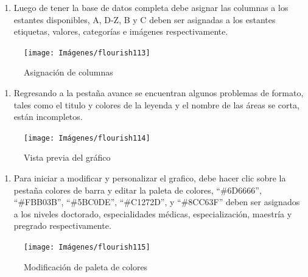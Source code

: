 \documentclass[
]{book}
\providecommand{\tightlist}{%
  \setlength{\itemsep}{0pt}\setlength{\parskip}{0pt}}
\begin{document}
\begin{enumerate}
\def\labelenumi{\arabic{enumi}.}
\setcounter{enumi}{3}
\tightlist
\item
  Luego de tener la base de datos completa debe asignar las columnas a los estantes disponibles, A, D-Z, B y C deben ser asignadas a los estantes etiquetas, valores, categorías e imágenes respectivamente.
\end{enumerate}

\begin{figure}

{\centering \texttt{[image: Imágenes/flourish113]} 

}

\caption{Asignación de columnas}\label{fig:paso4carrerabarrasflourish-fig}
\end{figure}

\begin{enumerate}
\def\labelenumi{\arabic{enumi}.}
\setcounter{enumi}{4}
\tightlist
\item
  Regresando a la pestaña avance se encuentran algunos problemas de formato, tales como el titulo y colores de la leyenda y el nombre de las áreas se corta, están incompletos.
\end{enumerate}

\begin{figure}

{\centering \texttt{[image: Imágenes/flourish114]} 

}

\caption{Vista previa del gráfico}\label{fig:paso5carrerabarrasflourish-fig}
\end{figure}

\begin{enumerate}
\def\labelenumi{\arabic{enumi}.}
\setcounter{enumi}{5}
\tightlist
\item
  Para iniciar a modificar y personalizar el grafico, debe hacer clic sobre la pestaña colores de barra y editar la paleta de colores, ``\#6D6666'', ``\#FBB03B'', ``\#5BC0DE'', ``\#C1272D'', y ``\#8CC63F'' deben ser asignados a los niveles doctorado, especialidades médicas, especialización, maestría y pregrado respectivamente.
\end{enumerate}

\begin{figure}

{\centering \texttt{[image: Imágenes/flourish115]} 

}

\caption{Modificación de paleta de colores}\label{fig:paso6carrerabarrasflourish-fig}
\end{figure}
\end{document}
